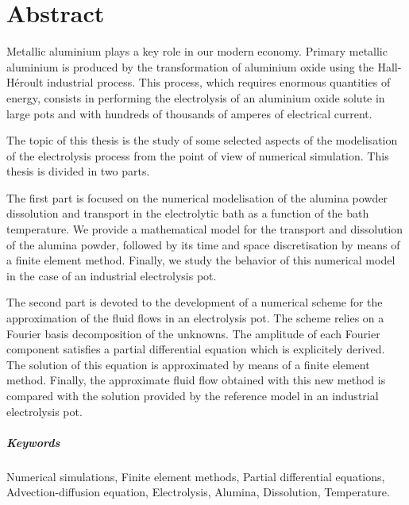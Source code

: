 \makeatletter
\@openrightfalse
\makeatother


\chapter*{Abstract}

Metallic aluminium plays a key role in our modern economy. Primary
metallic aluminium is produced by the transformation of aluminium
oxide using the Hall-Héroult industrial process. This process, which
requires enormous quantities of energy, consists in performing the
electrolysis of an aluminium oxide solute in large pots and with
hundreds of thousands of amperes of electrical current.

The topic of this thesis is the study of some selected aspects of the
modelisation of the electrolysis process from the point of view of
numerical simulation. This thesis is divided in two parts.

The first part is focused on the numerical modelisation of the alumina
powder dissolution and transport in the electrolytic bath as a
function of the bath temperature. We provide a mathematical model for the
transport and dissolution of the alumina powder, followed by its time
and space discretisation by means of a finite element
method. Finally, we study the behavior of this numerical model in
the case of an industrial electrolysis pot.

The second part is devoted to the development of a numerical scheme for
the approximation of the fluid flows in an electrolysis pot. The
scheme relies on a Fourier basis decomposition of the unknowns. The amplitude
of each Fourier component satisfies a partial differential equation
which is explicitely derived. The solution of this equation is
approximated by means of a finite element method. Finally, the
approximate fluid flow obtained with this new method is compared
with the solution provided by the reference model in an industrial
electrolysis pot.

\paragraph{Keywords}
Numerical simulations,
Finite element methods,
Partial differential equations,
Advection-diffusion equation,
Electrolysis,
Alumina,
Dissolution,
Temperature.


\makeatletter
\@openrighttrue
\makeatother
